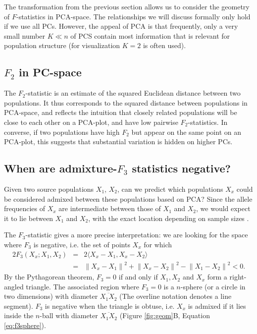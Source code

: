\documentclass[12pt,fullpage, a4paper]{article}
\newcommand{\normsq}[1]{\left\lVert#1\right\rVert^2}
\begin{document}
The transformation from the previous section allows us to consider the geometry
of $F$-statistics in PCA-space. The relationships we will discuss formally only
hold if we use all PCs. However, the appeal of PCA is that frequently,
only a very small number $K \ll n$ of PCS contain most information that is
relevant for population structure (for visualization
$K=2$ is often used). 

\subsection{$F_2$ in PC-space}
The $F_2$-statistic is an estimate of the squared Euclidean distance between two
populations. It thus corresponds to the squared distance between populations in PCA-space, and
reflects the intuition that closely related populations  will be close to each other on a
PCA-plot, and have low pairwise $F_2$-statistics. In converse, if two
populations have high $F_2$ but appear on the same point on an PCA-plot, this suggests
that substantial variation is hidden on higher PCs.


\subsection{When are admixture-$F_3$ statistics negative?}
Given two source populations $X_1$, $X_2$, can we predict which populations $X_x$ could be considered admixed between these populations based on PCA? Since the allele frequencies of $X_x$ are intermediate between those of $X_1$ and $X_2$, we would expect it to lie between $X_1$ and $X_2$, with the exact location depending on sample sizes \citep{brisbin2012, mcvean2009}. 

The $F_3$-statistic gives a more precise interpretation: we are looking for the space where $F_3$ is negative, i.e. the set of points $X_x$ for which 
\begin{eqnarray}
2 F_3(X_x; X_1, X_2) &=& 2\langle  X_x - X_1, X_x - X_2 \rangle \nonumber\\
      &=& \normsq{X_x - X_1} + \normsq{X_x - X_2}  - \normsq{X_1 - X_2} < 0 \label{eq:f3neg}\text{.}
\end{eqnarray}
By the Pythagorean theorem, $F_3 = 0 $ if and only if $X_1, X_2$ and $X_x$ form a right-angled triangle. The associated region where $F_3=0$ is a $n$-sphere (or a circle in two dimensions) with diameter $\overline{X_1X_2}$ (The overline notation denotes a line segment). $F_3$ is negative when the triangle is obtuse, i.e. $X_x$ is admixed if it lies inside the $n$-ball with diameter $\overline{X_1X_2}$ (Figure \ref{fig:geom}B, Equation \ref{eq:f3sphere}). 
\end{document}
